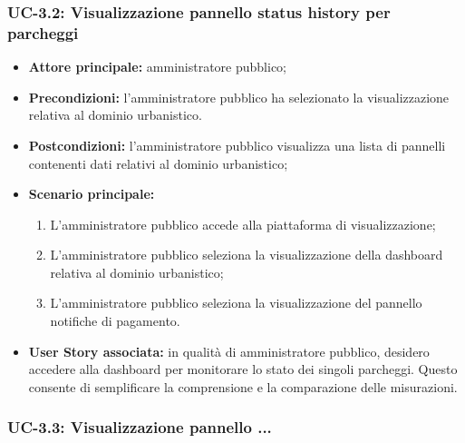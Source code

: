 \documentclass[8pt]{article}
\begin{document}
\subsubsection*{UC-3.2: Visualizzazione pannello status history per parcheggi}
\begin{itemize}
    \item \textbf{Attore principale:} amministratore pubblico;
    \item \textbf{Precondizioni:} l’amministratore pubblico ha selezionato la visualizzazione
        relativa al dominio urbanistico.
    \item \textbf{Postcondizioni:} l'amministratore pubblico visualizza una lista di pannelli
        contenenti dati relativi al dominio urbanistico;
    \item \textbf{Scenario principale:} 
    \begin{enumerate}
    \item L’amministratore pubblico accede alla piattaforma di visualizzazione;
    \item L’amministratore pubblico seleziona la visualizzazione della dashboard relativa al dominio
        urbanistico;
    \item L’amministratore pubblico seleziona la visualizzazione del pannello notifiche di
        pagamento.
    \end{enumerate}
    \item \textbf{User Story associata:} in qualità di amministratore pubblico, desidero accedere
        alla dashboard per monitorare lo stato dei singoli parcheggi. Questo consente di semplificare la
        comprensione e la comparazione delle misurazioni.
\end{itemize}
\subsubsection*{UC-3.3: Visualizzazione pannello ...}
\end{document}
